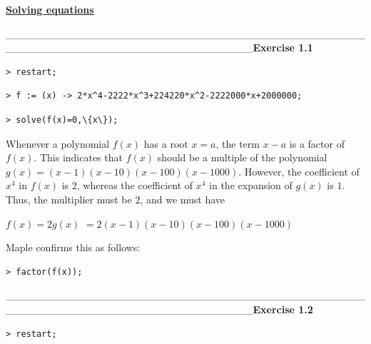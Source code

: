 \documentclass{article}
\begin{document}
\lstset{basicstyle=\ttfamily,breaklines=true,columns=flexible}
\pagestyle{empty}
\begin{center}
\begin{Maple Normal}
\underline{\textbf{Solving equations}}
\end{Maple Normal}
\end{center}
\_\_\_\_\_\_\_\_\_\_\_\_\_\_\_\_\_\_\_\_\_\_\_\_\_\_\_\_\_\_\_\_\_\_\_\_\_\_\_\_\_\_\_\_\_\_\_\_\_\_\_\_\_\_\_\_\_\_\_\_\_\_\_\_\_\_\_\_\_\_\_\_\_\_\_\_\_\_\_\_\_\textbf{Exercise 1.1}\begin{lstlisting}
> restart;
\end{lstlisting}
\begin{lstlisting}
> f := (x) -> 2*x^4-2222*x^3+224220*x^2-2222000*x+2000000;
\end{lstlisting}
\begin{lstlisting}
> solve(f(x)=0,\{x\});
\end{lstlisting}
Whenever a polynomial 
$ f (x) $ has a root 
$ x =a  $, the term 
$ x -a  $ is a factor of 
$ f (x) $.  This indicates that 
$ f (x) $ should be a multiple of the polynomial 
$ g (x)=(x -1) (x -10) (x -100) (x -1000) $.  However, the coefficient of 
$ x^{4} $ in 
$ f (x) $ is 
$ 2 $, whereas the coefficient of 
$ x^{4} $ in the expansion of 
$ g (x) $ is 
$ 1 $.  Thus, the multiplier must be 
$ 2 $, and we must have\begin{center}

$ f (x)=2 g (x) $
$ =2 (x -1) (x -10) (x -100) (x -1000) $\end{center}
Maple confirms this as follows:\begin{lstlisting}
> factor(f(x));
\end{lstlisting}
\_\_\_\_\_\_\_\_\_\_\_\_\_\_\_\_\_\_\_\_\_\_\_\_\_\_\_\_\_\_\_\_\_\_\_\_\_\_\_\_\_\_\_\_\_\_\_\_\_\_\_\_\_\_\_\_\_\_\_\_\_\_\_\_\_\_\_\_\_\_\_\_\_\_\_\_\_\_\_\_\_\textbf{Exercise 1.2}\begin{lstlisting}
> restart;
\end{lstlisting}
\end{document}
